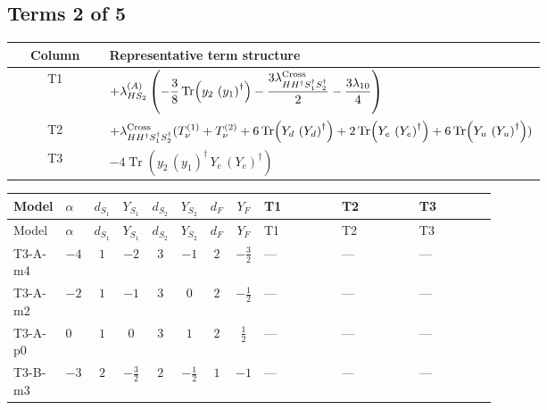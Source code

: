 \documentclass[8pt]{article}
\begin{document}
\begin{landscape}
\subsection*{Terms 2 of 5}
\begin{center}
\begin{tabular}{@{}c >{\raggedright\arraybackslash}p{0.82\linewidth}@{}}
\toprule
Column & Representative term structure \\
\midrule
T1 & \(\displaystyle +{\lambda_{HS_2}^{(A)}} \left(-\frac{3}{8} \operatorname{Tr}\!\left({y_2}\,\left({y_1}\right)^{\dagger}\right)-\frac{3 {\lambda_{H H^\dagger S_1^\dagger S_2^\dagger}^{\rm Cross}}}{2}-\frac{3 {\lambda_{10}}}{4}\right)\) \\
\midrule
T2 & \(\displaystyle +{\lambda_{H H^\dagger S_1^\dagger S_2^\dagger}^{\rm Cross}} (T_{\nu}^{(1)}+T_{\nu}^{(2)}+6 \operatorname{Tr}\!\left({Y_d}\,\left({Y_d}\right)^{\dagger}\right)+2 \operatorname{Tr}\!\left({Y_e}\,\left({Y_e}\right)^{\dagger}\right)+6 \operatorname{Tr}\!\left({Y_u}\,\left({Y_u}\right)^{\dagger}\right))\) \\
\midrule
T3 & \(\displaystyle -4 \operatorname{Tr}\!\left({y_2}\,\left({y_1}\right)^{\dagger}\,{Y_e}\,\left({Y_e}\right)^{\dagger}\right)\) \\
\midrule
\bottomrule
\end{tabular}
\end{center}
\smallskip
\tiny
\begin{longtable}{@{}llcccccc >{\raggedright\arraybackslash}p{0.21\linewidth} >{\raggedright\arraybackslash}p{0.21\linewidth} >{\raggedright\arraybackslash}p{0.21\linewidth}@{}}
\toprule
Model & $\alpha$ & $d_{S_1}$ & $Y_{S_1}$ & $d_{S_2}$ & $Y_{S_2}$ & $d_F$ & $Y_F$ & T1 & T2 & T3 \\
\midrule
\endfirsthead
\toprule
Model & $\alpha$ & $d_{S_1}$ & $Y_{S_1}$ & $d_{S_2}$ & $Y_{S_2}$ & $d_F$ & $Y_F$ & T1 & T2 & T3 \\
\midrule
\endhead
T3-A-m4 & $-4$ & $1$ & $-2$ & $3$ & $-1$ & $2$ & $-\frac{3}{2}$ & --- & --- & --- \\
\midrule
T3-A-m2 & $-2$ & $1$ & $-1$ & $3$ & $0$ & $2$ & $-\frac{1}{2}$ & --- & --- & --- \\
\midrule
T3-A-p0 & $0$ & $1$ & $0$ & $3$ & $1$ & $2$ & $\frac{1}{2}$ & --- & --- & --- \\
\midrule
T3-B-m3 & $-3$ & $2$ & $-\frac{3}{2}$ & $2$ & $-\frac{1}{2}$ & $1$ & $-1$ & --- & --- & --- \\
\midrule

\end{longtable}
\end{landscape}
\end{document}
